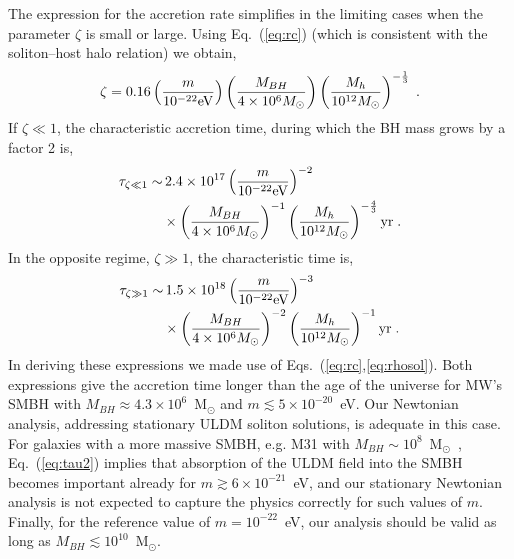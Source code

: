 \documentclass[aps,prd,floats,superscriptaddress,showpacs,nofootinbib,twocolumn,preprintnumbers]{revtex4-1}%
\def\no{\nonumber}
\begin{document}
\begin{appendix}
The expression for the accretion rate simplifies in the limiting cases
when the parameter $\zeta$ is small or large. 
Using Eq.~(\ref{eq:rc}) (which is
consistent with the soliton--host halo relation) we obtain,
\begin{equation}
\zeta=0.16\left(\frac{m}{10^{-22}{\rm
      eV}}\right)\left(\frac{M_{BH}}{4\times 10^6 M_{\odot}}\right)
\left(\frac{M_h}{10^{12} M_{\odot}}\right)^{-\frac{1}{3}}\;.\no
\end{equation}
If $\zeta\ll 1$, the characteristic accretion time, during which the
BH mass grows by a factor 2 is,
\begin{align}
\label{eq:tau1}
\tau_{\zeta\ll 1}\sim &\, 2.4\times 10^{17}
\left(\frac{m}{10^{-22}{\rm eV}}\right)^{-2}\\ 
&\times\left(\frac{M_{BH}}{4\times 10^6 M_{\odot}}\right)^{-1}
\left(\frac{M_h}{10^{12} M_{\odot}}\right)^{-\frac{4}{3}}{\rm
  yr}\;.\no
\end{align}
In the opposite regime, $\zeta\gg 1$, the characteristic time is, 
\begin{align}
\label{eq:tau2} 
\tau_{\zeta\gg 1}\sim &\, 1.5\times 10^{18}
\left(\frac{m}{10^{-22}{\rm eV}}\right)^{-3}\\ 
&\times\left(\frac{M_{BH}}{4\times 10^6 M_{\odot}}\right)^{-2}
\left(\frac{M_h}{10^{12} M_{\odot}}\right)^{-1}{\rm yr}\;.\no
\end{align}
In deriving these expressions we made use of
Eqs.~(\ref{eq:rc},\ref{eq:rhosol}). 
Both expressions give the accretion time longer than the age of the
universe for MW's SMBH with
$M_{BH}\approx4.3\times10^6$~M$_\odot$ and
$m\lesssim5\times10^{-20}$~eV. Our Newtonian analysis, addressing
stationary ULDM soliton solutions, is adequate in this case. For
galaxies with a more massive SMBH, e.g. M31 with
$M_{BH}\sim10^8$~M$_\odot$~\cite{Bender:2005rq},
Eq.~(\ref{eq:tau2}) implies that absorption of the ULDM field
into the SMBH becomes important already for
$m\gtrsim 6\times10^{-21}$~eV, and our stationary Newtonian analysis is
not expected to capture the physics correctly for such values of
$m$. Finally, for the reference value of $m=10^{-22}$~eV, our analysis
should be valid as long as $M_{BH}\lesssim10^{10}$~M$_\odot$. 



\end{appendix}
%


\vspace{6 pt}




\end{document}
